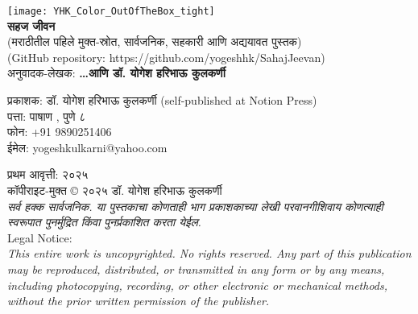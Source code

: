 \thispagestyle{empty}

\begin{center}
\texttt{[image: YHK\_Color\_OutOfTheBox\_tight]} \\[1.5em]

\textbf{\Huge सहज जीवन}\\ [0.5em]
{\small(मराठीतील पहिले मुक्त-स्रोत, सार्वजनिक, सहकारी आणि अद्ययावत  पुस्तक)}\\[0.5em]
{\small(GitHub repository: https://github.com/yogeshhk/SahajJeevan)}\\[0.5em]

अनुवादक-लेखक: \textbf{{\large \ldots  आणि  डॉ. योगेश हरिभाऊ कुलकर्णी}}\\[1.5em]
\end{center}

\vspace{1.5em}

\begin{flushleft}

प्रकाशक: डॉ. योगेश हरिभाऊ कुलकर्णी (self-published at Notion Press)\\
पत्ता:  पाषाण ,  पुणे ८ \\
फोन:  +91 9890251406\\
ईमेल: yogeshkulkarni@yahoo.com\\[1.5em]

\vspace{0.5em}

प्रथम आवृत्ती: २०२५\\[2.5em]


कॉपीराइट-मुक्त © २०२५ डॉ. योगेश हरिभाऊ कुलकर्णी\\[0.5em]

{\textit{सर्व हक्क सार्वजनिक. या पुस्तकाचा कोणताही भाग प्रकाशकाच्या लेखी परवानगीशिवाय कोणत्याही स्वरूपात पुनर्मुद्रित किंवा पुनर्प्रकाशित करता येईल.}}\\[1.5em]

{\large Legal Notice:}\\
{\textit{This entire work is uncopyrighted. No rights reserved. Any part of this publication may be reproduced, distributed, or transmitted in any form or by any means, including photocopying, recording, or other electronic or mechanical methods, without the prior written permission of the publisher.}}
\end{flushleft}
\vfill\null
\clearpage

